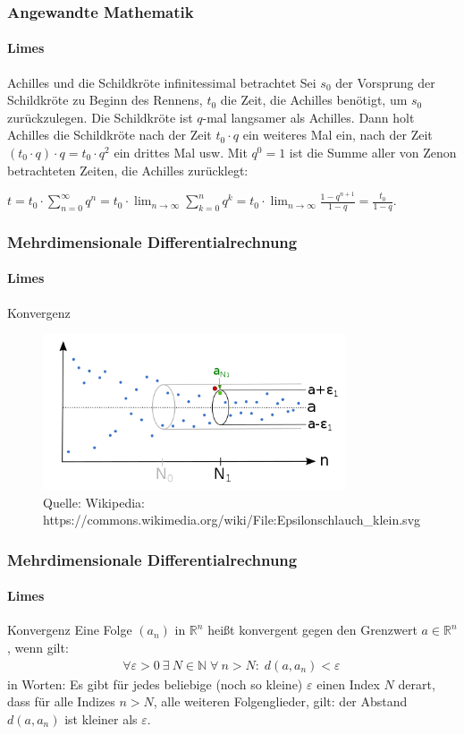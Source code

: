 \documentclass{beamer}
\begin{document}
\begin{frame}
    \frametitle{Angewandte Mathematik}
\framesubtitle{Limes}
    \begin{block}{Achilles und die Schildkröte infinitessimal betrachtet}
Sei $s_0$ der Vorsprung der Schildkröte zu Beginn des Rennens, $t_0$ die Zeit, die Achilles benötigt, um $s_0$ zurückzulegen. Die Schildkröte ist $q$-mal langsamer als Achilles.
Dann holt Achilles die Schildkröte nach der Zeit $t_0 \cdot q$ ein weiteres Mal ein, nach der Zeit $(t_0 \cdot q) \cdot q = t_0 \cdot q^2$ ein drittes Mal usw.
Mit $q^0 = 1$ ist die Summe aller von Zenon betrachteten Zeiten, die Achilles zurücklegt:

$t = t_0 \cdot \sum_{n=0}^\infty q^n = t_0 \cdot \lim_{n \to \infty} \sum_{k=0}^{n} q^{k} = t_0 \cdot \lim_{n \to \infty} \frac{1 - q^{n+1}}{1 -q} = \frac{t_0}{1 -q}$.
\end{block}
 \end{frame}


\begin{frame}
    \frametitle{Mehrdimensionale Differentialrechnung}
\framesubtitle{Limes}
    \begin{block}{Konvergenz}
\begin{figure}[H]
      \centering
    \includegraphics[width=0.8\textwidth]{images/500px-Epsilonschlauch_klein}
      \caption{Quelle: Wikipedia: https://commons.wikimedia.org/wiki/File:Epsilonschlauch\_klein.svg}
\end{figure}

\end{block}

 \end{frame}






\begin{frame}
    \frametitle{Mehrdimensionale Differentialrechnung}
\framesubtitle{Limes}
    \begin{block}{Konvergenz}
Eine Folge $(a_n)$ in $\mathbb{R}^n$ heißt konvergent gegen den Grenzwert $a \in \mathbb{R}^n$, wenn gilt:
\begin{align*}
\forall {\varepsilon > 0} \ \exists \ N \in \mathbb{N} \; \forall \ n > N: \; d(a, a_n) < \varepsilon\,
\end{align*}
in Worten: Es gibt für jedes beliebige (noch so kleine) $\varepsilon$ einen Index $N$ derart, dass für alle Indizes $n > N$, alle weiteren Folgenglieder, gilt: der Abstand $d(a, a_n)$ ist kleiner als $\varepsilon$.
\end{block}
 \end{frame}
\end{document}
